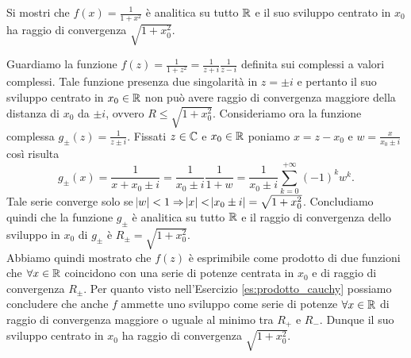 \begin{es}
  Si mostri che $ f(x) = \frac{1}{1 + x^2} $ è analitica su tutto $ \mathbb{R} $ e il suo sviluppo centrato in $ x_0 $ ha raggio di convergenza $ \sqrt{1 + x_0^2} $.
\end{es}
%
Guardiamo la funzione $ f(z) = \frac{1}{1 + z^2} = \frac{1}{z + i} \frac{1}{z - i} $ definita sui complessi a valori complessi. Tale funzione presenza due singolarità in $ z = \pm i $ e pertanto il suo sviluppo centrato in $ x_0 \in \mathbb{R} $ non può avere raggio di convergenza maggiore della distanza di $ x_0 $ da $ \pm i $, ovvero $ R \leq \sqrt{1 + x_0^2} $. Consideriamo ora la funzione complessa $ g_{\pm}(z) = \frac{1}{z \pm i} $. Fissati $ z \in \mathbb{C} $ e $ x_0 \in \mathbb{R} $ poniamo $ x = z - x_0 $ e $ w = \frac{x}{x_0 \pm i} $ così risulta
\begin{equation*}
  g_{\pm}(x) = \frac{1}{x + x_0 \pm i} = \frac{1}{x_0 \pm i} \frac{1}{1 + w} = \frac{1}{x_0 \pm i} \sum_{k = 0}^{+\infty}(-1)^k w^k.
\end{equation*}
Tale serie converge solo se $ \abs{w} < 1 \Rightarrow \abs{x} < \abs{x_0 \pm i} = \sqrt{1 + x_0^2} $. Concludiamo quindi che la funzione $ g_{\pm} $ è analitica su tutto $ \mathbb{R} $ e il raggio di convergenza dello sviluppo in $ x_0 $ di $ g_{\pm} $ è $ R_{\pm} = \sqrt{1 + x_0^2} $. \\
Abbiamo quindi mostrato che $ f(z) $ è esprimibile come prodotto di due funzioni che $ \forall x \in \mathbb{R} $ coincidono con una serie di potenze centrata in $ x_0 $ e di raggio di convergenza $ R_{\pm} $. Per quanto visto nell'Esercizio \ref{es:prodotto_cauchy} possiamo concludere che anche $ f $ ammette uno sviluppo come serie di potenze $ \forall x \in \mathbb{R} $ di raggio di convergenza maggiore o uguale al minimo tra $ R_+ $ e $ R_- $. Dunque il suo sviluppo centrato in $ x_0 $ ha raggio di convergenza $ \sqrt{1 + x_0^2} $.